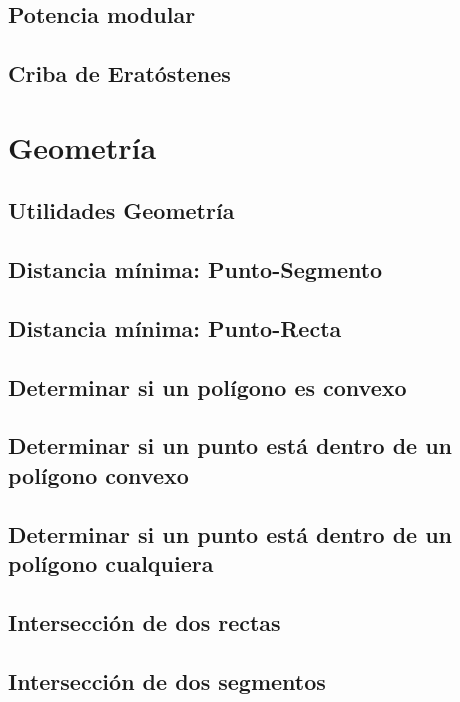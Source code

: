 \documentclass[10pt,letterpaper,twocolumn,twosided]{article}
\begin{document}
\subsection{Potencia modular}

\subsection{Criba de Eratóstenes}



\section{Geometría}

\subsection{Utilidades Geometría}

\subsection{Distancia mínima: Punto-Segmento}

\subsection{Distancia mínima: Punto-Recta}

\subsection{Determinar si un polígono es convexo}

\subsection{Determinar si un punto está dentro de un polígono convexo}

\subsection{Determinar si un punto está dentro de un polígono cualquiera}

\subsection{Intersección de dos rectas}

\subsection{Intersección de dos segmentos}
\end{document}
